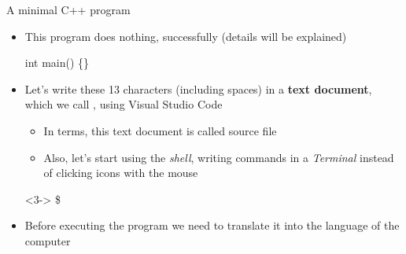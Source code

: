 \begin{frame}[fragile]{A minimal C++ program}

  \begin{itemize}
  \item This program does nothing, successfully (details will be explained)
    \begin{codeblock}
int main() \{\}\end{codeblock}

  \item<2-> Let's write these 13 characters (including spaces) in a \textbf{text
      document}, which we call , using Visual Studio Code
    \begin{itemize}
    \item In \Cpp{} terms, this text document is called \alert{source file}
    \item Also, let's start using the \textit{shell}, writing commands in a
      \textit{Terminal} instead of clicking icons with the mouse
    \end{itemize}

    \begin{shellblock}<3->{
\$
}\end{shellblock}


  \item<7> Before \alert{executing} the program we need to translate it into
    the language of the computer
  
  \end{itemize}

\end{frame}

